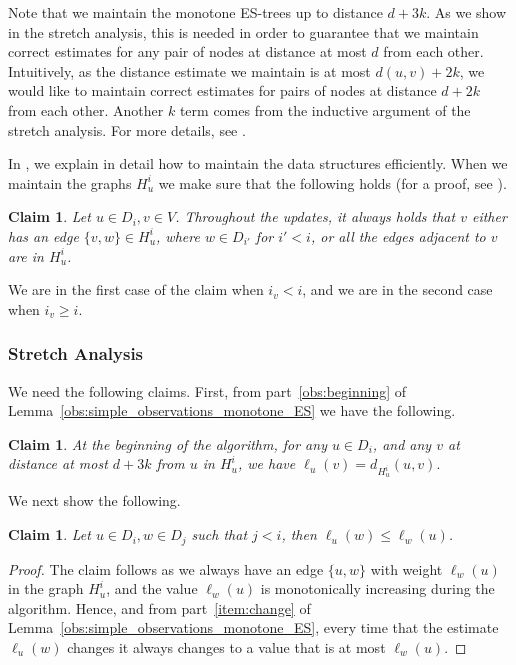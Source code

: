 \documentclass[11pt]{article}
\newtheorem{claim}[theorem]{Claim}
\theoremstyle{definition}
\theoremstyle{remark}
\begin{document}
\begin{titlepage}
Note that we maintain the monotone ES-trees up to distance $d+3k$. As we show in the stretch analysis, this is needed in order to guarantee that we maintain correct estimates for any pair of nodes at distance at most $d$ from each other. Intuitively, as the distance estimate we maintain is at most $d(u,v)+2k$, we would like to maintain correct estimates for pairs of nodes at distance $d+2k$ from each other. Another $k$ term comes from the inductive argument of the stretch analysis. For more details, see .

In , we explain in detail how to maintain the data structures efficiently. When we maintain the graphs $H_u^i$ we make sure that the following holds (for a proof, see ). 

\begin{claim}\label{claim_Hui}
Let $u \in D_i, v \in V$. Throughout the updates, it always holds that $v$ either has an edge $\{v,w\} \in H_u^i$, where $w \in D_{i'}$ for $i' < i$, or all the edges adjacent to $v$ are in $H_u^i$. 
\end{claim}

We are in the first case of the claim when $i_v <i$, and we are in the second case when $i_v \geq i$.

\subsubsection{Stretch Analysis} \label{sec_additive_stretch}

We need the following claims. First, from part~\ref{obs:beginning} of Lemma~\ref{obs:simple_observations_monotone_ES} we have the following.

\begin{claim} \label{claim_beginning}
At the beginning of the algorithm, for any $u \in D_i$, and any $v$ at distance at most $d+3k$ from $u$ in $H_u^i$, we have $\ell_u(v)=d_{H_u^i}(u,v).$
\end{claim}

We next show the following. 

\begin{claim} \label{claim_dist_smaller_dom}
Let $u \in D_i, w \in D_j$ such that $j < i$, then $\ell_u(w) \leq \ell_w(u)$. 
\end{claim}

\begin{proof}
The claim follows as we always have an edge $\{u,w\}$ with weight $\ell_w(u)$ in the graph $H_u^i$, and the value $\ell_w(u)$ is monotonically increasing during the algorithm. Hence, and from part~\ref{item:change} of Lemma~\ref{obs:simple_observations_monotone_ES},  every time that the estimate $\ell_u(w)$ changes it always changes to a value that is at most $\ell_w(u)$.
\end{proof}



\end{titlepage}
\end{document}
